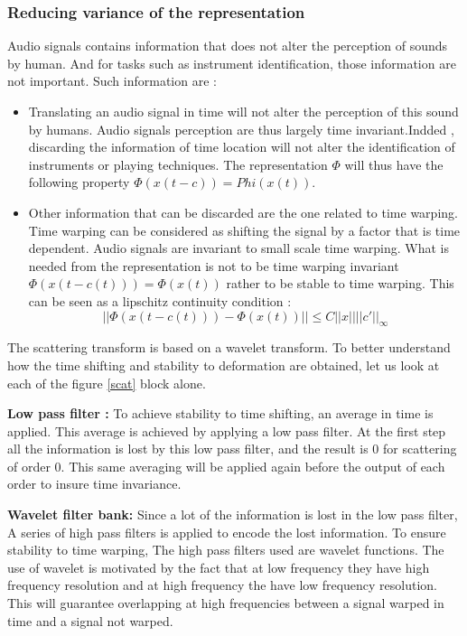\documentclass[hidelinks,12pt]{report}
\begin{document}
\subsubsection{Reducing variance of the representation}
Audio signals contains information that does not alter the perception of sounds by human. And for tasks such as instrument identification, those information are not important. Such information are : 
\begin{itemize}
\item Translating an audio signal in time will not alter the perception of this sound by humans. Audio signals perception are thus largely time invariant.Indded , discarding the information of time location will not alter the identification of instruments or playing techniques. The representation $\Phi$ will thus have the following property $\Phi(x(t-c))=Phi(x(t))$.
\item Other information that can be discarded are the one related to time warping. Time warping can be considered as shifting the signal by a factor that is time dependent. Audio signals are invariant to small scale time warping. What is needed from the representation is not to be time warping invariant $\Phi (x(t-c(t)))=\Phi(x(t))$ rather to be stable to time warping. This can be seen as a lipschitz continuity condition : $$||\Phi (x(t-c(t)))-\Phi(x(t))|| \leq C||x||||c'||_{\infty}$$
\end{itemize}
The scattering transform is based on a wavelet transform. To better understand how the time shifting and stability to deformation are obtained, let us look at each of the figure \ref{scat} block alone.\par
\textbf{Low pass filter :}
To achieve stability to time shifting, an average in time is applied. This average is achieved by applying a low pass filter. At the first step all the information is lost by this low pass filter, and the result is 0 for scattering of order 0. This same averaging will be applied again before the output of each order to insure time invariance.\par
\textbf{Wavelet filter bank:}
Since a lot of the information is lost in the low pass filter, A series of high pass filters is applied to encode the lost information. To ensure stability to time warping, The high pass filters used are wavelet functions. The use of wavelet is motivated by the fact that at low frequency they have high frequency resolution and at high frequency the have low frequency resolution. This will guarantee overlapping at high frequencies between a signal warped in time and a signal not warped.\par
\end{document}
